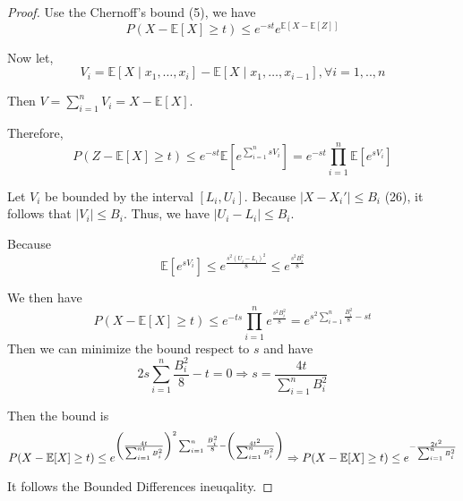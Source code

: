 \begin{proof}
  Use the Chernoff's bound (5), we have
  \begin{equation}
    P(X-\mathbb{E}[X] \geq t) \leq e^{-s t} e^{\mathbb{E}[X-\mathbb{E}[Z]]}
  \end{equation}
  
  Now let,
  \begin{equation}
    V_{i}=\mathbb{E}\left[X \mid x_{1}, \ldots, x_{i}\right]-\mathbb{E}\left[X \mid x_{1}, \ldots, x_{i-1}\right], \forall i=1, . ., n
  \end{equation}
  
  Then $V=\sum_{i=1}^{n} V_{i}=X-\mathbb{E}[X]$.

  Therefore, 
  \begin{equation}
    P(Z-\mathbb{E}[X] \geq t) \leq e^{-s t} \mathbb{E}\left[e^{\sum_{i=1}^{n} s V_{i}}\right]=e^{-s t} \prod_{i=1}^{n} \mathbb{E}\left[e^{s V_{i}}\right]
  \end{equation}

  Let $V_{i}$ be bounded by the interval $[L_i , U_i]$. 
  Because $\left| X - X_{i}' \right| \leq B_{i}$ (26), it follows that $\left| V_i \right| \leq B_i$.
  Thus, we have $\left| U_i - L_{i} \right| \leq B_i$.
  
  Because 
  \begin{equation}
    \mathbb{E}\left[e^{s V_{i}}\right] \leq e^{\frac{s^{2}\left(U_{i}-L_{i}\right)^{2}}{8}} \leq e^{\frac{s^{2} B_{i}^{2}}{8}}
  \end{equation}
  
  We then have 
  \begin{equation}
    P(X-\mathbb{E}[X] \geq t) \leq e^{-t s} \prod_{i=1}^{n} e^{\frac{s^{2} B_{i}^{2}}{8}}=e^{s^{2} \sum_{i=1}^{n} \frac{B_{i}^{2}}{8}-s t}
  \end{equation}
  Then we can minimize the bound respect to $s$ and have
  \begin{equation}
    2 s \sum_{i=1}^{n} \frac{B_{i}^{2}}{8}-t=0 
    \Rightarrow s=\frac{4 t}{\sum_{i=1}^{n} B_{i}^{2}}
  \end{equation}

  Then the bound is 
  \begin{equation}
    P(X-\mathbb{E}[X] \geq t) \leq e^{\left(\frac{4 t}{\sum_{i=1}^{n t} B_{i}^{2}}\right)^{2} \sum_{i=1}^{n} \frac{B_{i}^{2}}{8}-\left(\frac{4 t^{2}}{\sum_{i=1}^{n} B_{i}^{2}}\right)} \\
    \Rightarrow P(X- \mathbb{E}[X] \geq t) \leq e^{- \frac{2t^2}{\sum_{i=1}^{n} B_{i}^2}}
  \end{equation}

  It follows the Bounded Differences ineuqality.
\end{proof}
  
